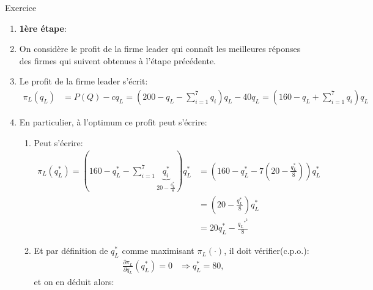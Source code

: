 \begin{frame}[allowframebreaks]{Exercice}
\begin{enumerate}
\begin{enumerate}[$\star$]
             \framebreak
             \item \textbf{1ère étape}:
             \item On considère le profit de la firme leader qui connaît les meilleures réponses des firmes 
             qui suivent obtenues à l'étape précédente.  
             \item Le profit de la firme leader s'écrit:
             \begin{align*}
                \pi_L(q_L) &= P(Q)-cq_L =  \left(200 -q_L - \sum_{i=1}^7 q_i\right)q_L - 40q_L 
                = \left(160 -q_L + \sum_{i=1}^7 q_i\right) q_L
             \end{align*}
             \item En particulier, à l'optimum ce profit peut s'écrire:
             \begin{enumerate}[$\star$]
                \item Peut s'écrire:
                \begin{align*}
                \pi_L(q_L^*) = \left(160 -q_L^* - \sum_{i=1}^7 \underbrace{q_i^*}_{20 -\frac{q_L^*}{8}}\right)q_L^* 
                &= \left(160 -q_L^* - 7\left(20 -\frac{q_L^*}{8}\right)\right)q_L^*\\
                &= \left(20-\frac{q_L^*}{8}\right)q_L^*\\
                &= 20q_L^* -\frac{q_L{^{*^2}}}{8}
               \end{align*}
               \item Et par définition de $q_L^*$ comme maximisant $\pi_L(\cdot)$, il doit vérifier(c.p.o.):  
               \begin{align*}
                \frac{\partial \pi_L}{\partial q_L}(q_L^*) = 0 &\Rightarrow q_L^* = 80,
               \end{align*}
               et on en déduit alors: 
               

\end{enumerate}
\end{enumerate}
\end{enumerate}
\end{frame}
